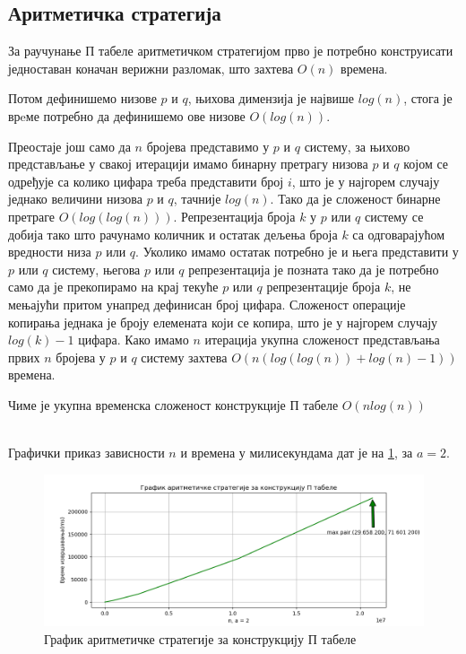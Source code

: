 \documentclass[a4paper]{article}
\begin{document}
\subsection{Аритметичка стратегија}

За раучунање П табеле аритметичком стратегијом прво је потребно конструисати једноставан коначан верижни разломак, што захтева $ O(n) $ времена. 

Потом дефинишемо низове $ p $ и $ q $, њихова димензија је највише $ log(n) $, стога је врeме потребно да дефинишемо ове низове $ O(log(n)) $.

Преостаје још само да $ n $ бројева представимо у $ p $ и $ q $ систему, за њихово представљање у свакој итерацији имамо бинарну претрагу низова $ p $ и $ q $ којом се одређује са колико цифара треба представити број $ i $, што је у најгорем случају једнако величини низова $ p $ и $ q $, тачније $ log(n) $. Тако да је сложеност бинарне претраге $ O(log(log(n))) $. Репрезентација броја $ k $ у $ p $ или $ q $ систему се добија тако што рачунамо количник и остатак дељења броја $ k $ са одговарајућом вредности низа $ p $ или $ q $. Уколико имамо остатак потребно је и њега представити у $ p $ или $ q $ систему, његова $ p $ или $ q $ репрезентација је позната тако да је потребно само да је прекопирамо на крај текуће $ p $ или $ q $ репрезентације броја $ k $, не мењајући притом унапред дефинисан број цифара. Сложеност операције копирања једнака је броју елемената који се копира, што је у најгорем случају $ log(k) - 1 $ цифара. Како имамо $ n $ итерација укупна сложеност представљања првих $ n $ бројева у $ p $ и $ q $ систему захтева $ O(n(log(log(n)) + log(n) - 1)) $ времена.

Чиме је укупна временска сложеност конструкције П табеле $ O(nlog(n)) $



\leavevmode\\
Графички приказ зависности $ n $ и времена у милисекундама дат је на \ref{fig:arithmetic}, за $ a = 2 $.

\begin{figure}[H]
	\caption{График аритметичке стратегије за конструкцију П табеле}
	\label{fig:arithmetic}
	\begin{center}
		\includegraphics[width=\textwidth]{arithmetic.png}
	\end{center}
\end{figure}
\end{document}
